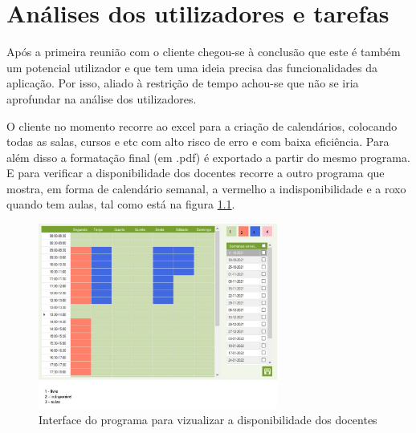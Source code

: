 \documentclass[11pt, twoside]{report}
\begin{document}
	
	
	
	\chapter{Análises dos utilizadores e tarefas}
	\label{analiseutilizador}
	
	Após a primeira reunião com o cliente chegou-se à conclusão que  este é também um potencial utilizador e que tem uma ideia precisa das funcionalidades da aplicação. Por isso, aliado à restrição de tempo achou-se que não se iria aprofundar na análise dos utilizadores. 
	
	O cliente no momento recorre ao excel para a criação de calendários,  colocando todas as salas, cursos e etc com alto risco de erro e com baixa eficiência. Para além disso a formatação final (em .pdf) é exportado a partir do mesmo programa. E para verificar a disponibilidade dos docentes recorre a outro programa que mostra, em forma de calendário semanal, a vermelho a indisponibilidade e a roxo quando tem aulas, tal como está na figura \ref{disponibilidadedocentes}. 
	
	
	\begin{figure}[H] 
		\centering 
		\includegraphics[width=0.7\textwidth,height=0.7\textheight,keepaspectratio]{image/ColorMap}
		\caption{Interface do programa para vizualizar a disponibilidade dos docentes}
		\label{disponibilidadedocentes}
	\end{figure}
	
\end{document}

